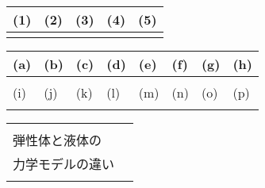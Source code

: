 

\begin{table}[htb]
  \begin{center} 
    \begin{tabular}{|p{}|p{}|p{}|p{}|p{}|} \hline
      (1) & (2) & (3) & (4) & (5)\\ \hline \hline
        &  & & &  \\ \hline		
    \end{tabular}
  \end{center}
\end{table}

  \begin{table}[htb]
    \begin{center} 
      \begin{tabular}{|p{}|p{}|p{}|p{}|p{}|p{}|p{}|p{}|} \hline
        (a) & (b) & (c) & (d) & (e) & (f) & (g) & (h)\\ \hline
          &  & & & & & &  \\ \hline		
          (i) & (j) & (k) & (l) & (m) & (n) & (o) & (p)\\ \hline
          &  & & & & & &  \\ \hline		
      \end{tabular}
    \end{center}
  \end{table}

\begin{table}[htb]
  \begin{center} 
    \begin{tabular}{|l|p{}|} \hline
      & \\
      弾性体と液体の  & \\
      力学モデルの違い  & \\ 
      & \\ \hline
    \end{tabular}
  \end{center}
\end{table}

